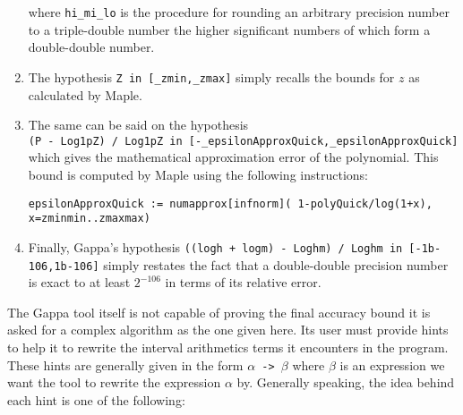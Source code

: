 \begin{enumerate}
\begin{lstlisting}[caption={Maple code for computing $logi_\hi$ and $logi_\mi$},firstnumber=35]
\end{lstlisting}
where {\tt hi\_mi\_lo} is the procedure for rounding an arbitrary precision number to a triple-double number the higher
significant numbers of which form a double-double number.
\item The hypothesis {\tt Z in [\_zmin,\_zmax]} simply recalls the bounds for $z$ as calculated by Maple.
\item The same can be said on the hypothesis \\
{\tt (P - Log1pZ) / Log1pZ in [-\_epsilonApproxQuick,\_epsilonApproxQuick]} \\
which gives the mathematical approximation error of the polynomial. This bound is computed by Maple using the following
instructions:
\begin{lstlisting}[caption={Maple code for computing the relative error of the polynomial},firstnumber=129]
epsilonApproxQuick := numapprox[infnorm]( 1-polyQuick/log(1+x), x=zminmin..zmaxmax)
\end{lstlisting}
\item Finally, Gappa's hypothesis {\tt ((logh + logm) - Loghm) / Loghm in [-1b-106,1b-106]} 
simply restates the fact that a double-double precision number is exact to 
at least $2^{-106}$ in terms of its relative error.
\end{enumerate}
The Gappa tool itself is not capable of proving the final accuracy bound it is asked for a complex algorithm as the 
one given here. Its user must provide hints to help it to rewrite the interval arithmetics terms it encounters
in the program. These hints are generally given in the form {\tt $\alpha$ -> $\beta$} 
where $\beta$ is an expression we want the
tool to rewrite the expression $\alpha$ by. Generally speaking, the idea behind each hint is one of the following:

